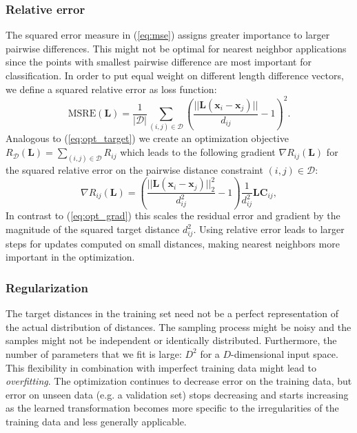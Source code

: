 \documentclass[a4paper,titlepage]{article}
\renewcommand{\vec}[1]{\mathbf{#1}}
\newcommand{\mat}[1]{\mathbf{#1}}
\begin{document}
\subsubsection{Relative error}

The squared error measure in (\ref{eq:mse}) assigns greater importance to larger pairwise differences. This might not be optimal for nearest neighbor applications since the points with smallest pairwise difference are most important for classification.  In order to put equal weight on different length difference vectors, we define a squared relative error as loss function:
\begin{equation}
\text{MSRE}(\mat{L}) = \frac{1}{|\mathcal{D}|}\sum_{(i,j) \in \mathcal{D}} \left ( \frac{||\mat{L} (\vec{x}_i - \vec{x}_j)||}{d_{ij}} - 1 \right)^2.
\label{eq:msre}
\end{equation}
Analogous to (\ref{eq:opt_target}) we create an optimization objective $R_{\mathcal{D}}(\mat{L}) = \sum_{(i,j) \in \mathcal{D}} R_{ij}$ which leads to the following gradient $\nabla R_{ij}(\mat{L})$ for the squared relative error on the pairwise distance constraint $(i,j) \in \mathcal{D}$:
\begin{equation}
\nabla R_{ij}(\mat{L})  =  \left ( \frac{||\mat{L}(\vec{x}_i - \vec{x}_j)||_2^2}{d_{ij}^2} - 1 \right) \frac{1}{d_{ij}^2} \mat{L} \mat{C}_{ij},
\label{eq:relative_grad}
\end{equation}
In contrast to (\ref{eq:opt_grad}) this scales the residual error and gradient by the magnitude of the squared target distance $d_{ij}^2$. Using relative error leads to larger steps for updates computed on small distances, making nearest neighbors more important in the optimization.


\subsubsection{Regularization}

The target distances in the training set need not be a perfect representation of the actual distribution of distances. The sampling process might be noisy and the samples might not be independent or identically distributed. Furthermore, the number of parameters that we fit is large: $D^2$ for a $D$-dimensional input space. This flexibility in combination with imperfect training data might lead to \emph{overfitting}. The optimization continues to decrease error on the training data, but error on unseen data (e.g. a validation set) stops decreasing and starts increasing as the learned transformation becomes more specific to the irregularities of the training data and less generally applicable.
\end{document}
